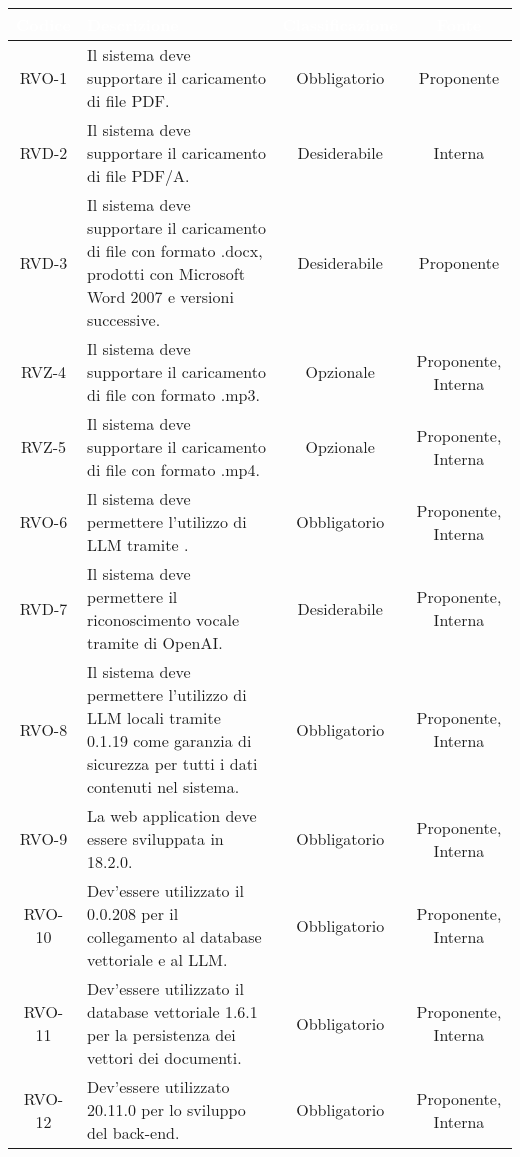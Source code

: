 \begingroup
\setlength{\tabcolsep}{10pt}
\renewcommand{\arraystretch}{1.5}
\begin{xltabular}{\textwidth}{| c | X | c | c |}
    \hline
     \textbf{\textcolor{white}{Codice}} & \textbf{\textcolor{white}{Descrizione}} & \textbf{\textcolor{white}{Classificazione}} & \textbf{\textcolor{white}{Fonte}}\\
    \hline
    \endhead
    RVO-1 & Il sistema deve supportare il caricamento di file PDF. & Obbligatorio & Proponente \\
    \hline
    RVD-2 & Il sistema deve supportare il caricamento di file PDF/A. & Desiderabile & Interna \\
    \hline
    RVD-3 & Il sistema deve supportare il caricamento di  file con formato .docx, prodotti con Microsoft Word 2007 e versioni successive. & Desiderabile & Proponente \\
    \hline
    RVZ-4 & Il sistema deve supportare il caricamento di  file con formato .mp3. & Opzionale & Proponente, Interna \\
    \hline
    RVZ-5 & Il sistema deve supportare il caricamento di  file con formato .mp4. & Opzionale & Proponente, Interna \\
    \hline
    RVO-6 & Il sistema deve permettere l'utilizzo di LLM tramite . & Obbligatorio & Proponente, Interna \\
    \hline
    RVD-7 & Il sistema deve permettere il riconoscimento vocale tramite  di OpenAI. & Desiderabile & Proponente, Interna \\
    \hline
    RVO-8 & Il sistema deve permettere l'utilizzo di LLM locali tramite  0.1.19 come garanzia di sicurezza per tutti i dati contenuti nel sistema. & Obbligatorio & Proponente, Interna \\
    \hline
    RVO-9 & La web application deve essere sviluppata in  18.2.0. & Obbligatorio & Proponente, Interna \\
    \hline
    RVO-10 & Dev'essere utilizzato il   0.0.208 per il collegamento al database vettoriale e al LLM. & Obbligatorio & Proponente, Interna \\
    \hline
    RVO-11 & Dev'essere utilizzato il database vettoriale  1.6.1 per la persistenza dei vettori  dei documenti. & Obbligatorio & Proponente, Interna \\
    \hline
    RVO-12 & Dev'essere utilizzato  20.11.0 per lo sviluppo del back-end. & Obbligatorio & Proponente, Interna \\

\end{xltabular}
